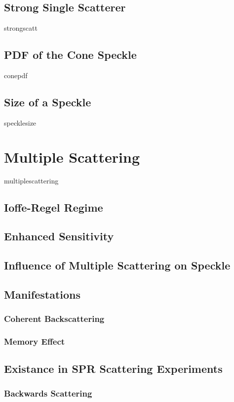 \documentclass[a4paper,titlepage,onecolumn]{report}
\begin{document}
		\subsection{Strong Single Scatterer}
		{strongscatt}
  \subsection{PDF of the Cone Speckle}
		{conepdf}
		\subsection{Size of a Speckle}
		{specklesize}
		\section{Multiple Scattering} \label{sec:multiplescattering}
 {multiplescattering}
  \subsection{Ioffe-Regel Regime}
  \subsection{Enhanced Sensitivity}
  \subsection{Influence of Multiple Scattering on Speckle}
  \subsection{Manifestations}
   \subsubsection{Coherent Backscattering}
   \subsubsection{Memory Effect}
  \subsection{Existance in SPR Scattering Experiments}
   \subsubsection{Backwards Scattering}
\end{document}
